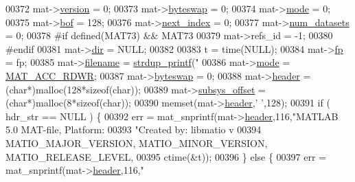 \begin{DoxyCode}
00372     mat->\hyperlink{struct__mat__t_a729c2bc0afc97485057a5af425635b1a}{version}       = 0;
00373     mat->\hyperlink{struct__mat__t_a99d207977af5e04941ace56d71817a40}{byteswap}      = 0;
00374     mat->\hyperlink{struct__mat__t_aa43288b63b8edb7cadf0b79e2d1df2ee}{mode}          = 0;
00375     mat->\hyperlink{struct__mat__t_a0f87794a6113bd568fe591953e20ddf3}{bof}           = 128;
00376     mat->\hyperlink{struct__mat__t_a0163a12f9735356723bb604992639d9e}{next\_index}    = 0;
00377     mat->\hyperlink{struct__mat__t_af37d0ba323e65edb27ecd5a2f766a3a4}{num\_datasets}  = 0;
00378 \textcolor{preprocessor}{#if defined(MAT73) && MAT73}
00379     mat->refs\_id       = -1;
00380 \textcolor{preprocessor}{#endif}
00381     mat->\hyperlink{struct__mat__t_a1bc6c604459d0787801d5e53d365684c}{dir}           = NULL;
00382 
00383     t = time(NULL);
00384     mat->\hyperlink{struct__mat__t_a85f562e407ca9ad4d2a6e14f839432b7}{fp}       = fp;
00385     mat->\hyperlink{struct__mat__t_a340b191598135edd03b6dec847f0b1b1}{filename} = \hyperlink{group__mat__util_ga291b08f933c75fb70e3736b669896ebd}{strdup\_printf}(\textcolor{stringliteral}{"%
00386     mat->\hyperlink{struct__mat__t_aa43288b63b8edb7cadf0b79e2d1df2ee}{mode}     = \hyperlink{group___m_a_t_ggaa9dcbc70f538af79bd557593ff6b5cdba0f65f27ea42fde32d62b702b82329c1f}{MAT\_ACC\_RDWR};
00387     mat->\hyperlink{struct__mat__t_a99d207977af5e04941ace56d71817a40}{byteswap} = 0;
00388     mat->\hyperlink{struct__mat__t_a5ed5d0e4e3c4d76b626a8a1772d579c4}{header}   = (\textcolor{keywordtype}{char}*)malloc(128*\textcolor{keyword}{sizeof}(\textcolor{keywordtype}{char}));
00389     mat->\hyperlink{struct__mat__t_a19317c01209959d755d69311960d3eec}{subsys\_offset} = (\textcolor{keywordtype}{char}*)malloc(8*\textcolor{keyword}{sizeof}(\textcolor{keywordtype}{char}));
00390     memset(mat->\hyperlink{struct__mat__t_a5ed5d0e4e3c4d76b626a8a1772d579c4}{header},\textcolor{charliteral}{' '},128);
00391     \textcolor{keywordflow}{if} ( hdr\_str == NULL ) \{
00392         err = mat\_snprintf(mat->\hyperlink{struct__mat__t_a5ed5d0e4e3c4d76b626a8a1772d579c4}{header},116,\textcolor{stringliteral}{"MATLAB 5.0 MAT-file, Platform: %
00393                 \textcolor{stringliteral}{"Created by: libmatio v%
00394                 MATIO\_MAJOR\_VERSION, MATIO\_MINOR\_VERSION, MATIO\_RELEASE\_LEVEL,
00395                 ctime(&t));
00396     \} \textcolor{keywordflow}{else} \{
00397         err = mat\_snprintf(mat->\hyperlink{struct__mat__t_a5ed5d0e4e3c4d76b626a8a1772d579c4}{header},116,\textcolor{stringliteral}{"%
}}}}
\end{DoxyCode}
